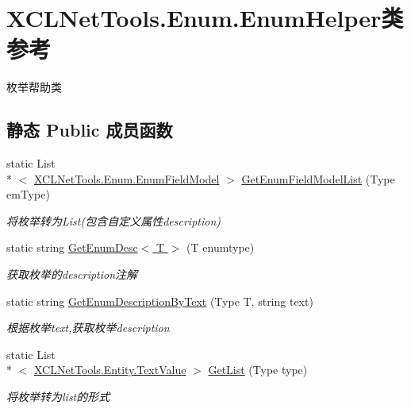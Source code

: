 \hypertarget{class_x_c_l_net_tools_1_1_enum_1_1_enum_helper}{\section{X\-C\-L\-Net\-Tools.\-Enum.\-Enum\-Helper类 参考}
\label{class_x_c_l_net_tools_1_1_enum_1_1_enum_helper}
}


枚举帮助类  


\subsection*{静态 Public 成员函数}
\begin{DoxyCompactItemize}
\item 
static List\\*
$<$ \hyperlink{class_x_c_l_net_tools_1_1_enum_1_1_enum_field_model}{X\-C\-L\-Net\-Tools.\-Enum.\-Enum\-Field\-Model} $>$ \hyperlink{class_x_c_l_net_tools_1_1_enum_1_1_enum_helper_a0752040ae4080822f0358e7d4a8cb75d}{Get\-Enum\-Field\-Model\-List} (Type em\-Type)
\begin{DoxyCompactList}\small\item\em 将枚举转为\-List(包含自定义属性description) \end{DoxyCompactList}\item 
static string \hyperlink{class_x_c_l_net_tools_1_1_enum_1_1_enum_helper_a3445493f9dd4798778af8ecfb2062b1b}{Get\-Enum\-Desc$<$ T $>$} (T enumtype)
\begin{DoxyCompactList}\small\item\em 获取枚举的description注解 \end{DoxyCompactList}\item 
static string \hyperlink{class_x_c_l_net_tools_1_1_enum_1_1_enum_helper_ac1c67f6247644347ed4673965832feaf}{Get\-Enum\-Description\-By\-Text} (Type T, string text)
\begin{DoxyCompactList}\small\item\em 根据枚举text,获取枚举description \end{DoxyCompactList}\item 
static List\\*
$<$ \hyperlink{class_x_c_l_net_tools_1_1_entity_1_1_text_value}{X\-C\-L\-Net\-Tools.\-Entity.\-Text\-Value} $>$ \hyperlink{class_x_c_l_net_tools_1_1_enum_1_1_enum_helper_a0f98e6348aacd00a6254794e6565c173}{Get\-List} (Type type)
\begin{DoxyCompactList}\small\item\em 将枚举转为list的形式 \end{DoxyCompactList}\item 

\end{DoxyCompactItemize}
